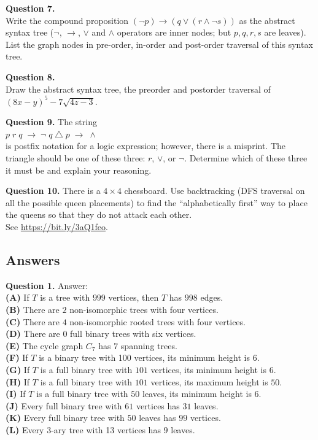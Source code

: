 \documentclass[jou]{apa6}
\begin{document}
\vspace{10pt}
{\bf Question 7.}\\
Write the compound proposition $(\neg p) \rightarrow (q \vee (r \wedge \neg s))$ 
as the abstract syntax tree ($\neg$, $\rightarrow$, $\vee$ and $\wedge$ operators
are inner nodes; but $p,q,r,s$ are leaves).\\
List the graph nodes in pre-order, in-order and post-order traversal of this syntax tree.


\vspace{10pt}
{\bf Question 8.}\\
Draw the abstract syntax tree, the preorder and postorder traversal 
of $(8x - y)^5 - 7\sqrt{4z - 3}$.


\vspace{10pt}
{\bf Question 9.} 
The string\\
$p\;r\;q\;\rightarrow\;\neg\;q\;\triangle\;p\;\rightarrow\;\wedge$\\
is postfix notation for a logic expression; however, there is a misprint. The
triangle should be one of these three: $r$, $\vee$, or $\neg$. 
Determine which of these three it must be and explain your
reasoning.


\vspace{10pt}
{\bf Question 10.} 
There is a $4 \times 4$ chessboard. Use backtracking (DFS traversal on all the possible queen placements) 
to find the ``alphabetically first'' way to place the queens so that they do not attack each other.\\
See \url{https://bit.ly/3aQ1feo}.


\newpage
\subsection{Answers}

\vspace{10pt}
{\bf Question 1.} Answer:\\
{\bf (A)} If $T$ is a tree with $999$ vertices, then $T$ has $998$ edges.\\
{\bf (B)} There are $2$ non-isomorphic trees with four vertices.\\
{\bf (C)} There are $4$ non-isomorphic rooted trees with four vertices.\\
{\bf (D)} There are $0$ full binary trees with six vertices.\\
{\bf (E)} The cycle graph $C_7$ has $7$ spanning trees.\\
{\bf (F)} If $T$ is a binary tree with 100 vertices, its minimum height is $6$.\\
{\bf (G)} If $T$ is a full binary tree with $101$ vertices, its minimum height is $6$.\\
{\bf (H)} If $T$ is a full binary tree with $101$ vertices, its maximum height is $50$.\\
{\bf (I)} If $T$ is a full binary tree with $50$ leaves, its minimum height is $6$.\\
{\bf (J)} Every full binary tree with $61$ vertices has $31$ leaves.\\
{\bf (K)} Every full binary tree with $50$ leaves has $99$ vertices.\\
{\bf (L)} Every 3-ary tree with 13 vertices has $9$ leaves.
\end{document}
